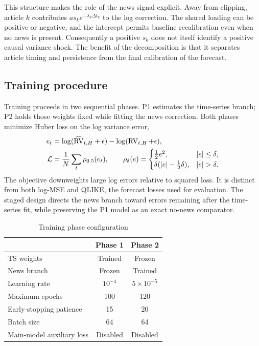 This structure makes the role of the news signal explicit. Away from
clipping, article $k$ contributes $a s_k e^{-\lambda_k\Delta t_k}$ to the
log correction. The shared loading can be positive or negative, and the
intercept permits baseline recalibration even when no news is present.
Consequently a positive $s_k$ does not itself identify a positive causal
variance shock. The benefit of the decomposition is that it separates
article timing and persistence from the final calibration of the forecast.

\subsection{Training procedure}\label{sec:training}
Training proceeds in two sequential phases. P1 estimates the time-series
branch; P2 holds those weights fixed while fitting the news correction.
Both phases minimize Huber loss on the log variance error,
\begin{align}
 e_t&=\log(\widehat{\RV}_{t,H}+\epsilon)-\log(\RV_{t,H}+\epsilon),\\
 \mathcal L&=\frac1N\sum_t\rho_{0.5}(e_t),\qquad
 \rho_\delta(e)=\begin{cases}\frac12e^2,&|e|\leq\delta,\\
 \delta(|e|-\frac12\delta),&|e|>\delta.
 \end{cases}\label{eq:loss}
\end{align}
The objective downweights large log errors relative to squared loss.
It is distinct from both log-MSE and QLIKE, the forecast losses used
for evaluation. The staged design directs the news branch toward errors
remaining after the time-series fit, while preserving the P1 model as
an exact no-news comparator.

\begin{table}[htbp]
\centering\small
\caption{Training phase configuration}\label{tab:training_phases}
\begin{tabular}{@{}lcc@{}}
\toprule
 & Phase 1 & Phase 2 \\
\midrule
TS weights & Trained & Frozen \\
News branch & Frozen & Trained \\
Learning rate & $10^{-4}$ & $5\times10^{-5}$ \\
Maximum epochs & 100 & 120 \\
Early-stopping patience & 15 & 20 \\
Batch size & 64 & 64 \\
Main-model auxiliary loss & Disabled & Disabled \\
\bottomrule
\end{tabular}
\end{table}

